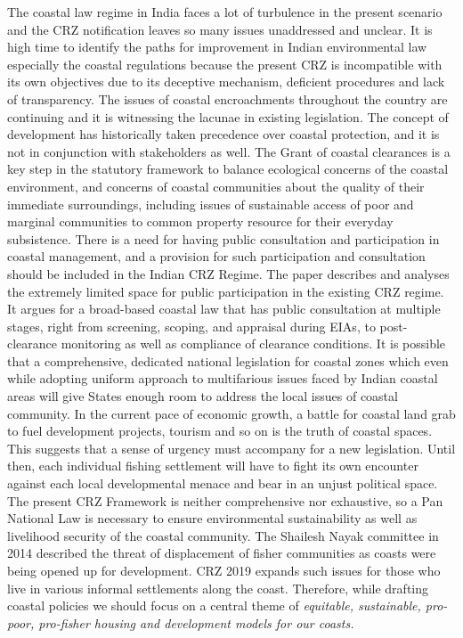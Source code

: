 \begin{multicols}{2}
\noi
The coastal law regime in India faces a lot of turbulence in the present scenario and the CRZ
notification leaves so many issues unaddressed and unclear. It is high time to identify the
paths for improvement in Indian environmental law especially the coastal regulations because
the present CRZ is incompatible with its own objectives due to its deceptive mechanism,
deficient procedures and lack of transparency. The issues of coastal encroachments
throughout the country are continuing and it is witnessing the lacunae in existing legislation.
The concept of development has historically taken precedence over coastal protection, and it
is not in conjunction with stakeholders as well. The Grant of coastal clearances is a key step
in the statutory framework to balance ecological concerns of the coastal environment, and
concerns of coastal communities about the quality of their immediate surroundings, including
issues of sustainable access of poor and marginal communities to common property resource
for their everyday subsistence. There is a need for having public consultation and
participation in coastal management, and a provision for such participation and consultation
should be included in the Indian CRZ Regime. The paper describes and analyses the
extremely limited space for public participation in the existing CRZ regime. It argues for a
broad-based coastal law that has public consultation at multiple stages, right from screening, 
scoping, and appraisal during EIAs, to post-clearance monitoring as well as compliance of
clearance conditions. It is possible that a comprehensive, dedicated national legislation for
coastal zones which even while adopting uniform approach to multifarious issues faced by
Indian coastal areas will give States enough room to address the local issues of coastal
community. In the current pace of economic growth, a battle for coastal land grab to fuel
development projects, tourism and so on is the truth of coastal spaces. This suggests that a
sense of urgency must accompany for a new legislation. Until then, each individual fishing
settlement will have to fight its own encounter against each local developmental menace and
bear in an unjust political space. The present CRZ Framework is neither comprehensive nor
exhaustive, so a Pan National Law is necessary to ensure environmental sustainability as well
as livelihood security of the coastal community. The Shailesh Nayak committee in 2014
described the threat of displacement of fisher communities as coasts were being opened
up for development. CRZ 2019 expands such issues for those who live in various
informal settlements along the coast. Therefore, while drafting coastal policies we
should focus on a central theme of \textit{equitable, sustainable, pro-poor, pro-fisher housing
and development models for our coasts.}

\end{multicols}
\label{end2020-art3}
